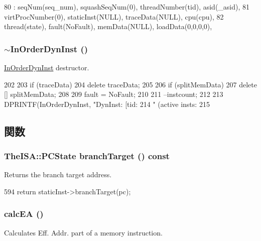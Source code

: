 \begin{DoxyCode}
80   : seqNum(seq_num), squashSeqNum(0), threadNumber(tid), asid(_asid),
81     virtProcNumber(0), staticInst(NULL), traceData(NULL), cpu(cpu),
82     thread(state), fault(NoFault), memData(NULL), loadData({0,0,0,0}),
\end{DoxyCode}
\hypertarget{classInOrderDynInst_a507a5c030f96b7add10d1c29b386f727}{
\subsubsection[{$\sim$InOrderDynInst}]{\setlength{\rightskip}{0pt plus 5cm}$\sim${\bf InOrderDynInst} ()}}
\label{classInOrderDynInst_a507a5c030f96b7add10d1c29b386f727}
\hyperlink{classInOrderDynInst}{InOrderDynInst} destructor. 


\begin{DoxyCode}
202 {
203     if (traceData)
204         delete traceData;
205 
206     if (splitMemData)
207         delete [] splitMemData;
208 
209     fault = NoFault;
210 
211     --instcount;
212 
213     DPRINTF(InOrderDynInst, "DynInst: [tid:%
214             " (active insts: %
215 }
\end{DoxyCode}


\subsection{関数}
\hypertarget{classInOrderDynInst_a066dfcf24b065ae319cc2d27aa4eb09c}{
\subsubsection[{branchTarget}]{\setlength{\rightskip}{0pt plus 5cm}TheISA::PCState branchTarget () const}}
\label{classInOrderDynInst_a066dfcf24b065ae319cc2d27aa4eb09c}
Returns the branch target address. 


\begin{DoxyCode}
594     { return staticInst->branchTarget(pc); }
\end{DoxyCode}
\hypertarget{classInOrderDynInst_a1a338741bddb2eb956bda5a4188949cf}{
\subsubsection[{calcEA}]{ calcEA ()}}
\label{classInOrderDynInst_a1a338741bddb2eb956bda5a4188949cf}
Calculates Eff. Addr. part of a memory instruction. 


